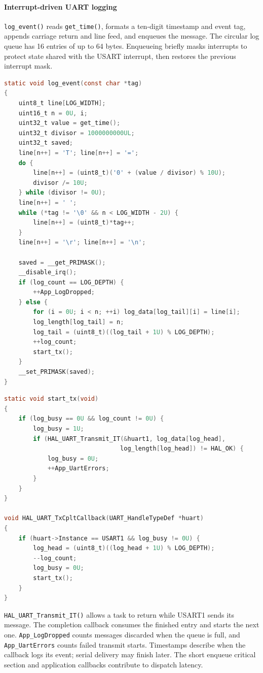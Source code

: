 \paragraph{Interrupt-driven UART logging}
\texttt{log\_event()} reads \texttt{get\_time()}, formats a ten-digit timestamp and event tag, appends carriage return and line feed, and enqueues the message. The circular log queue has 16 entries of up to 64 bytes. Enqueueing briefly masks interrupts to protect state shared with the USART interrupt, then restores the previous interrupt mask.

\begin{lstlisting}[caption={Formatting and queueing timestamped log messages},language=C]
static void log_event(const char *tag)
{
    uint8_t line[LOG_WIDTH];
    uint16_t n = 0U, i;
    uint32_t value = get_time();
    uint32_t divisor = 1000000000UL;
    uint32_t saved;
    line[n++] = 'T'; line[n++] = '=';
    do {
        line[n++] = (uint8_t)('0' + (value / divisor) % 10U);
        divisor /= 10U;
    } while (divisor != 0U);
    line[n++] = ' ';
    while (*tag != '\0' && n < LOG_WIDTH - 2U) {
        line[n++] = (uint8_t)*tag++;
    }
    line[n++] = '\r'; line[n++] = '\n';

    saved = __get_PRIMASK();
    __disable_irq();
    if (log_count == LOG_DEPTH) {
        ++App_LogDropped;
    } else {
        for (i = 0U; i < n; ++i) log_data[log_tail][i] = line[i];
        log_length[log_tail] = n;
        log_tail = (uint8_t)((log_tail + 1U) % LOG_DEPTH);
        ++log_count;
        start_tx();
    }
    __set_PRIMASK(saved);
}
\end{lstlisting}

\begin{lstlisting}[caption={Starting and completing UART transmission},language=C]
static void start_tx(void)
{
    if (log_busy == 0U && log_count != 0U) {
        log_busy = 1U;
        if (HAL_UART_Transmit_IT(&huart1, log_data[log_head],
                                log_length[log_head]) != HAL_OK) {
            log_busy = 0U;
            ++App_UartErrors;
        }
    }
}

void HAL_UART_TxCpltCallback(UART_HandleTypeDef *huart)
{
    if (huart->Instance == USART1 && log_busy != 0U) {
        log_head = (uint8_t)((log_head + 1U) % LOG_DEPTH);
        --log_count;
        log_busy = 0U;
        start_tx();
    }
}
\end{lstlisting}

\texttt{HAL\_UART\_Transmit\_IT()} allows a task to return while USART1 sends its message. The completion callback consumes the finished entry and starts the next one. \texttt{App\_LogDropped} counts messages discarded when the queue is full, and \texttt{App\_UartErrors} counts failed transmit starts. Timestamps describe when the callback logs its event; serial delivery may finish later. The short enqueue critical section and application callbacks contribute to dispatch latency.

